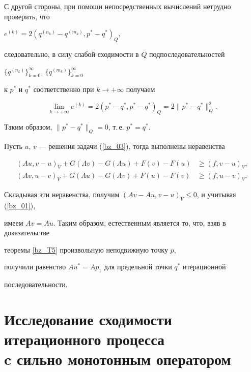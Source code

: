 \begin{pf}
С другой стороны, при помощи непосредственных вычислений нетрудно проверить, что


$e^{(k)}= 2 ({q^{(n_k)}-q^{(m_k)}, {p^*}-{q^*}})_Q$,


следовательно, в силу слабой сходимости в $Q$ подпоследовательностей 


$ \{{q^{(n_k)}} \}^\infty_{k=0}$, $ \{{q^{(m_k)}} \}^\infty_{k=0} $ 


к ${p^*}$ и ${q^*}$ соответственно при ${k \to +\infty}$ получаем


$$


\lim_{k\to+\infty}e^{(k)}=2({p^*}-{q^*},{p^*}-{q^*})_Q=2\|{p^*}-{q^*}\|_Q^2.


$$





Таким образом, $ \|{{p^*}-{q^*}} \|_Q=0$, т.\,е. ${{p^*}={q^*}}$.


\end{pf} 





\begin{notenonum} \label{du03_N1}


Пусть $u$, $v$ --- решения задачи (\ref{bz_03}), тогда выполнены неравенства


\begin{align*}


(A u , v-u)_V+G (\Lambda v)-G (\Lambda u)+F(v)-F(u) &\geq (f , v-u)_V , \\


(A v , u-v)_V+G (\Lambda u)-G (\Lambda v)+F(u)-F(v) &\geq (f , u-v)_V . 


\end{align*}


Складывая эти неравенства, получим $(Av-A u , v-u)_V \leq 0$, и учитывая (\ref{bz_01}),


имеем $Av=A u $. Таким образом, естественным является то, что, взяв в доказательстве 


теоремы \ref{bz_T5} произвольную неподвижную точку $p$,


получили равенство $A u^*=A p_1$ для предельной точки $q^*$ итерационной 


последовательности.


\end{notenonum}








\section{Исследование сходимости итерационного процесса\protect\\


c сильно монотонным оператором}








